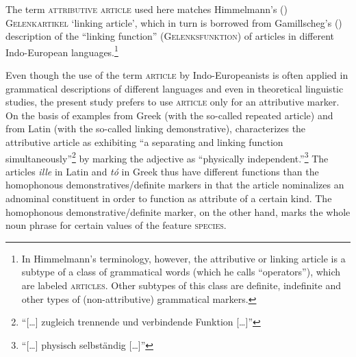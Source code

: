 The term \textsc{attributive article} used here matches Himmelmann's (\citeyear{himmelmann1997}) \textsc{Gelenkartikel} ‘linking article’, which in turn is borrowed from Gamillscheg's (\citeyear{gamillscheg1937}) description of the “linking function” (\textsc{Gelenksfunktion}) of articles in different Indo-European languages.\footnote{In Himmelmann's \citeyear{himmelmann1997} terminology, however, the attributive or linking article is a subtype of a class of grammatical words (which he calls “operators”), which are labeled \textsc{articles}. Other subtypes of this class are definite, indefinite and other types of (non-attributive) grammatical markers.} 

Even though the use of the term \textsc{article} by Indo-Europeanists is often applied in grammatical descriptions of different languages and even in theoretical linguistic studies, the present study prefers to use \textsc{article} only for an attributive marker. On the basis of examples from Greek (with the so-called repeated article) and from Latin (with the so-called linking demonstrative), \citet[48]{gamillscheg1937} characterizes the attributive article as exhibiting “a separating and linking function simultaneously”\footnote{“[\dots] zugleich trennende und verbindende Funktion [\dots]”} by marking the adjective as “physically independent.”\footnote{“[\dots] physisch selbständig [\dots]”} The articles \textit{ille} in Latin and \textit{tó} in Greek thus have different functions than the homophonous demonstratives\slash{}definite markers in that the article nominalizes an adnominal constituent in order to function as attribute of a certain kind. The homophonous demonstrative\slash{}definite marker, on the other hand, marks the whole noun phrase for certain values of the feature \textsc{species}.

